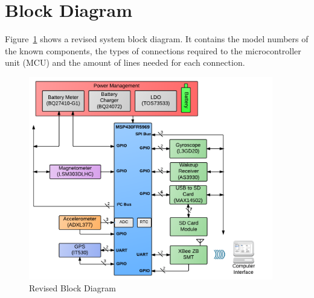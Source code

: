 \section{Block Diagram}

Figure~\ref{fig:blockDiagram} shows a revised system block diagram.  It contains the model numbers of the known components, the types of connections required to the microcontroller unit (MCU) and the amount of lines needed for each connection.

\begin{figure}[H]
	\centering
	\includegraphics[width=0.95\textwidth]{img/blockDiagram}
	\caption{Revised Block Diagram \label{fig:blockDiagram}}
\end{figure}


